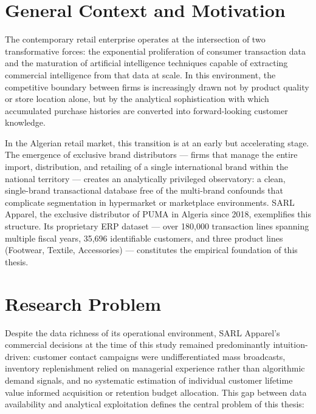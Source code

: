 
\section*{General Context and Motivation}

The contemporary retail enterprise operates at the intersection of two transformative forces: the exponential proliferation of consumer transaction data and the maturation of artificial intelligence techniques capable of extracting commercial intelligence from that data at scale. In this environment, the competitive boundary between firms is increasingly drawn not by product quality or store location alone, but by the analytical sophistication with which accumulated purchase histories are converted into forward-looking customer knowledge.

In the Algerian retail market, this transition is at an early but accelerating stage. The emergence of exclusive brand distributors — firms that manage the entire import, distribution, and retailing of a single international brand within the national territory — creates an analytically privileged observatory: a clean, single-brand transactional database free of the multi-brand confounds that complicate segmentation in hypermarket or marketplace environments. SARL Apparel, the exclusive distributor of PUMA in Algeria since 2018, exemplifies this structure. Its proprietary ERP dataset — over 180,000 transaction lines spanning multiple fiscal years, 35,696 identifiable customers, and three product lines (Footwear, Textile, Accessories) — constitutes the empirical foundation of this thesis.

\section*{Research Problem}

Despite the data richness of its operational environment, SARL Apparel's commercial decisions at the time of this study remained predominantly intuition-driven: customer contact campaigns were undifferentiated mass broadcasts, inventory replenishment relied on managerial experience rather than algorithmic demand signals, and no systematic estimation of individual customer lifetime value informed acquisition or retention budget allocation. This gap between data availability and analytical exploitation defines the central problem of this thesis:

